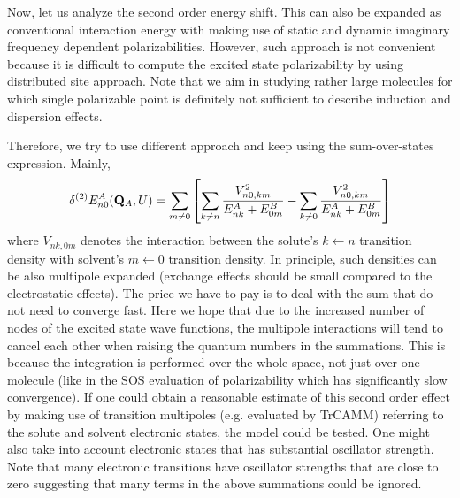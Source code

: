 Now, let us analyze the second order energy shift. This can also
be expanded as conventional interaction energy with making use
of static and dynamic imaginary frequency dependent polarizabilities.
However, such approach is not convenient because it is difficult
to compute the excited state polarizability by using distributed
site approach. Note that we aim in studying rather large molecules
for which single polarizable point is definitely not sufficient to
describe induction and dispersion effects.

Therefore, we try to use different approach and keep using the 
sum\hyp{}over\hyp{}states expression. Mainly,
%
\begin{equation}
\delta^{(2)} E^A_{n0}({\bf Q}_A, U) = 
\sum_{m\ne 0} 
\left[
\sum_{k\ne n}  \frac{ V_{n0,km}^2 }{E^A_{nk} + E^B_{0m}}
%
- \sum_{k\ne 0} \frac{
V_{n0,km}^2
}{E^A_{nk} + E^B_{0m}}
\right]
\end{equation}
%
where $V_{nk,0m}$ denotes the interaction between the 
solute's $k\leftarrow n$ transition density with
solvent's $m\leftarrow 0$ transition density. In principle,
such densities can be also multipole expanded (exchange effects should
be small compared to the electrostatic effects).
The price we have to pay is to deal with the sum that do not need to
converge fast. Here we hope that due to the increased number
of nodes of the excited state wave functions, the multipole
interactions will tend to cancel each other when raising the
quantum numbers in the summations. This is because
the integration is performed over the whole space, not
just over one molecule (like in the SOS evaluation of polarizability which
has significantly slow convergence).
If one could obtain a reasonable estimate of this second order 
effect by making use of transition multipoles (e.g. evaluated by TrCAMM) 
referring to the solute and solvent electronic
states, the model could be tested. One might also take into account
electronic states that has substantial oscillator strength. Note that
many electronic transitions have oscillator strengths that are
close to zero suggesting that
many terms in the above summations could be ignored.

